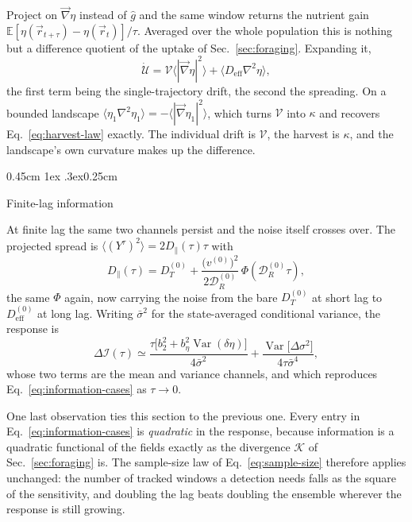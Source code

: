 \documentclass[
  reprint,
  superscriptaddress,
  amsmath,
  amssymb,
  aps,
  pre,
  nofootinbib,
  floatfix
]{revtex4-2}
\makeatletter
\newcommand{\rv}{\vec r}
\newcommand{\grad}{\vec{\nabla}}
\newcommand{\lap}{\nabla^2}
\newcommand{\DR}{\mathcal D_R^{(0)}}
\newcommand{\Irate}{\mathcal I}
\DeclareMathOperator{\Var}{Var}
\def\subsection{\@startsection{subsection}{2}{\z@}%
  {0.45cm \@plus1ex \@minus.3ex}{0.25cm}%
  {\normalfont\small\bfseries\raggedright}}%
\makeatother
\begin{document}
Project on $\grad\eta$ instead of $\hat g$ and the same window returns the
nutrient gain $\mathbb E[\eta(\rv_{t+\tau})-\eta(\rv_t)]/\tau$.
Averaged over the whole population this is nothing but a difference quotient
of the uptake of Sec.~\ref{sec:foraging}.  Expanding it,
\begin{equation}
 \dot{\mathcal U}
 =\mathcal V\bigl\langle|\grad\eta|^{2}\bigr\rangle
 +\bigl\langle D_{\mathrm{eff}}\lap\eta\bigr\rangle,
 \label{eq:gain-identity}
\end{equation}
the first term being the single-trajectory drift, the second the spreading.
On a bounded landscape
$\langle\eta_1\lap\eta_1\rangle=-\langle|\grad\eta_1|^2\rangle$, which turns
$\mathcal V$ into $\kappa$ and recovers Eq.~\eqref{eq:harvest-law} exactly.
The individual drift is $\mathcal V$, the harvest is $\kappa$, and the
landscape's own curvature makes up the difference.

\subsection{Finite-lag information}

At finite lag the same two channels persist and the noise itself crosses over.
The projected spread is $\langle(Y^\tau)^2\rangle=2D_\parallel(\tau)\tau$ with
\begin{equation}
 D_\parallel(\tau)=D_T^{(0)}
 +\frac{\bigl(v^{(0)}\bigr)^{2}}{2\DR}\,\Phi\!\left(\DR\tau\right),
 \label{eq:projected-diffusivity}
\end{equation}
the same $\Phi$ again, now carrying the noise from the bare $D_T^{(0)}$ at
short lag to $D_{\mathrm{eff}}^{(0)}$ at long lag.  Writing $\bar\sigma^2$ for
the state-averaged conditional variance, the response is
\begin{equation}
 \Delta\Irate(\tau)\simeq
 \frac{\tau\bigl[b_2^{2}+b_\eta^{2}\Var(\delta\eta)\bigr]}{4\bar\sigma^{2}}
 +\frac{\Var\bigl[\Delta\sigma^{2}\bigr]}{4\tau\bar\sigma^{4}},
 \label{eq:finite-lag-information}
\end{equation}
whose two terms are the mean and variance channels, and which reproduces
Eq.~\eqref{eq:information-cases} as $\tau\to0$.

One last observation ties this section to the previous one.  Every entry in
Eq.~\eqref{eq:information-cases} is \emph{quadratic} in the response, because
information is a quadratic functional of the fields exactly as the divergence
$\mathcal K$ of Sec.~\ref{sec:foraging} is.  The sample-size law of
Eq.~\eqref{eq:sample-size} therefore applies unchanged: the number of tracked
windows a detection needs falls as the square of the sensitivity, and doubling
the lag beats doubling the ensemble wherever the response is still growing.
\end{document}
